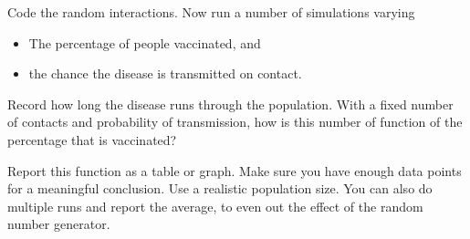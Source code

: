 \begin{exercise}
  \label{ex:infect:3}
  Code the random interactions. Now run a number of simulations varying
  \begin{itemize}
  \item The percentage of people vaccinated, and
  \item the chance the disease is transmitted on contact.
  \end{itemize}
  Record how long the disease runs through the population. With a
  fixed number of contacts and probability of transmission, how is
  this number of function of the percentage that is vaccinated?

  Report this function as a table or graph. Make sure you have enough
  data points for a meaningful conclusion. Use a realistic population size.
  You can also do multiple runs and report the average, to even out
  the effect of the random number generator.
\end{exercise}
\begin{comment}
\begin{verbatim}
for p in 0 10 25 50 75 90 95 98 ; do (echo 400 ; echo .2 ; echo $p ) 
    | ./infect3 ; done


An vaccination percentage of 0 leads to a maximum number of infected
of 17052 or 42.6325 percent
The disease ran its course in 38 days
susceptible people unaffected: 17295 out of 40000

An vaccination percentage of 10 leads to a maximum number of infected
of 14719 or 36.8 percent
The disease ran its course in 36 days
susceptible people unaffected: 15797 out of 36043

An vaccination percentage of 25 leads to a maximum number of infected
of 10823 or 27.06 percent
The disease ran its course in 37 days
susceptible people unaffected: 13576 out of 29993

An vaccination percentage of 50 leads to a maximum number of infected
of 5075 or 12.69 percent
The disease ran its course in 52 days
susceptible people unaffected: 9925 out of 20017

An vaccination percentage of 75 leads to a maximum number of infected
of   0 or 0.0025 percent
The disease ran its course in 6 days
susceptible people unaffected: 9922 out of 9922

An vaccination percentage of 90 leads to a maximum number of infected
of   0 or 0.0025 percent
The disease ran its course in 6 days
susceptible people unaffected: 3971 out of 3971

An vaccination percentage of 95 leads to a maximum number of infected
of   0 or 0.0025 percent
The disease ran its course in 6 days
susceptible people unaffected: 1990 out of 1990

An vaccination percentage of 98 leads to a maximum number of infected
of   0 or 0.0025 percent
The disease ran its course in 6 days
susceptible people unaffected: 843 out of 843
\end{verbatim}
\end{comment}

